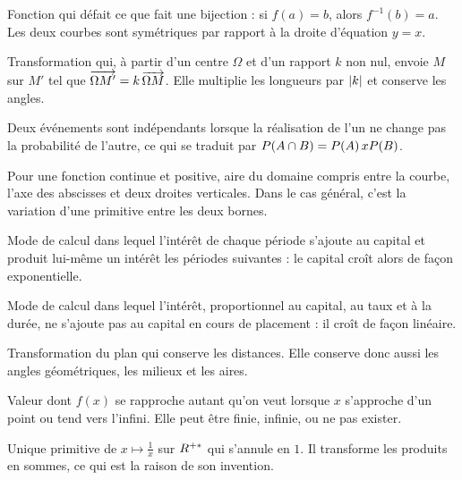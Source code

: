 
Fonction qui défait ce que fait une bijection : si $f(a) = b$, alors
$f^{-1}(b) = a$. Les deux courbes sont symétriques par rapport à la droite
d'équation $y = x$.


Transformation qui, à partir d'un centre $\Omega$ et d'un rapport $k$ non nul,
envoie $M$ sur $M'$ tel que $\overrightarrow{\Omega M'} = k\,\overrightarrow{\Omega M}$. Elle
multiplie les longueurs par $\left|k\right|$ et conserve les angles.


Deux événements sont indépendants lorsque la réalisation de l'un ne change pas
la probabilité de l'autre, ce qui se traduit par
$P\!\left(A \cap B\right) = P\!\left(A\right) x P\!\left(B\right)$.

Pour une fonction continue et positive, aire du domaine compris entre la
courbe, l'axe des abscisses et deux droites verticales. Dans le cas général,
c'est la variation d'une primitive entre les deux bornes.

Mode de calcul dans lequel l'intérêt de chaque période s'ajoute au capital et
produit lui-même un intérêt les périodes suivantes : le capital croît alors
de façon exponentielle.

Mode de calcul dans lequel l'intérêt, proportionnel au capital, au taux et à
la durée, ne s'ajoute pas au capital en cours de placement : il croît de
façon linéaire.

Transformation du plan qui conserve les distances. Elle conserve donc aussi
les angles géométriques, les milieux et les aires.


Valeur dont $f(x)$ se rapproche autant qu'on veut lorsque $x$ s'approche d'un
point ou tend vers l'infini. Elle peut être finie, infinie, ou ne pas exister.

Unique primitive de $x \mapsto \frac1x$ sur $R^{+*}$ qui s'annule en $1$. Il
transforme les produits en sommes, ce qui est la raison de son invention.

